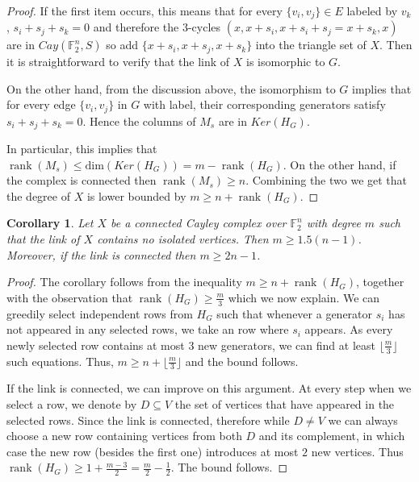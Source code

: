 \documentclass[10pt,a4paper]{article}
\newtheorem{corollary}[theorem]{Corollary}
\theoremstyle{definition}
\theoremstyle{remark}
\newcommand{\set}[1]{\{#1\}}
\def\dim{\mathrm{ dim}}
\newcommand{\F}{\mathbb{F}}
\DeclareMathOperator{\rank}{rank}
\renewcommand{\leq}{\leqslant}
\renewcommand{\geq}{\geqslant}
\numberwithin{equation}{section}
\newcommand{\fl}[1]{\lfloor #1 \rfloor}
\begin{document}
\begin{proof}
    If the first item occurs, this means that for every \(\set{v_i,v_j} \in E\) labeled by \(v_k\), \(s_i+s_j+s_k = 0\) and therefore the \(3\)-cycles \((x,x+s_i,x+s_i+s_j=x+s_k,x)\) are in \(Cay(\F_2^n,S)\) so add \(\set{x+s_i,x+s_j,x+s_k}\) into the triangle set of $X$. Then it is straightforward to verify that the link of \(X\) is isomorphic to \(G\).

    On the other hand, from the discussion above, the isomorphism to \(G\) implies that for every edge \(\set{v_i,v_j}\) in $G$ with label, their corresponding generators satisfy \(s_i+s_j+s_k = 0\). Hence the columns of $M_s$ are in \(Ker(H_G)\).

    In particular, this implies that \(\rank(M_s) \leq \dim(Ker(H_G)) = m-\rank(H_G)\). On the other hand, if the complex is connected then \(\rank(M_s) \geq n\). Combining the two we get that the degree of $X$ is lower bounded by \(m \geq n+\rank(H_G)\).
\end{proof}

\begin{corollary}
    Let \(X\) be a connected Cayley complex over \(\F_2^n\) with degree \(m\) such that the link of \(X\) contains no isolated vertices. Then \(m \geq 1.5 (n-1) \). Moreover, if the link is connected then \(m \geq 2n-1\).
\end{corollary}

\begin{proof}
    The corollary follows from the inequality \(m \geq n+\rank(H_G)\), together with the observation that \(\rank(H_G) \geq \frac{m}{3}\) which we now explain. We can greedily select independent rows from \(H_G\) such that whenever a generator \(s_i\) has not appeared in any selected rows, we take an row where \(s_i\) appears. As every newly selected row contains at most \(3\) new generators, we can find at least \(\fl{\frac{m}{3}}\) such equations. Thus,
    \(m \geq n+\fl{\frac{m}{3}}\) and the bound follows.

    If the link is connected, we can improve on this argument. At every step when we select a row, we denote by \(D \subseteq V\) the set of vertices that have appeared in the selected rows. Since the link is connected, therefore while \(D\ne V\) we can always choose a new row containing vertices from both $D$ and its complement, in which case the new row (besides the first one) introduces at most \(2\) new vertices. Thus \(\rank(H_G) \geq 1+\frac{m-3}{2} = \frac{m}{2}-\frac{1}{2}\). The bound follows.
\end{proof}
\end{document}
